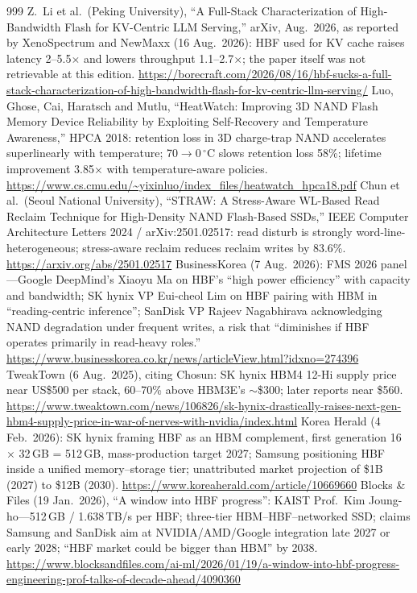 \begin{thebibliography}{999}
 Z.~Li et al.\ (Peking University), ``A Full-Stack Characterization of High-Bandwidth Flash for KV-Centric LLM Serving,'' arXiv, Aug.\ 2026, as reported by XenoSpectrum and NewMaxx (16 Aug.\ 2026): HBF used for KV cache raises latency 2--5.5$\times$ and lowers throughput 1.1--2.7$\times$; the paper itself was not retrievable at this edition. \url{https://borecraft.com/2026/08/16/hbf-sucks-a-full-stack-characterization-of-high-bandwidth-flash-for-kv-centric-llm-serving/}
 Luo, Ghose, Cai, Haratsch and Mutlu, ``HeatWatch: Improving 3D NAND Flash Memory Device Reliability by Exploiting Self-Recovery and Temperature Awareness,'' HPCA 2018: retention loss in 3D charge-trap NAND accelerates superlinearly with temperature; 70$\to$0\,$^\circ$C slows retention loss 58\%; lifetime improvement 3.85$\times$ with temperature-aware policies. \url{https://www.cs.cmu.edu/~yixinluo/index_files/heatwatch_hpca18.pdf}
 Chun et al.\ (Seoul National University), ``STRAW: A Stress-Aware WL-Based Read Reclaim Technique for High-Density NAND Flash-Based SSDs,'' IEEE Computer Architecture Letters 2024 / arXiv:2501.02517: read disturb is strongly word-line-heterogeneous; stress-aware reclaim reduces reclaim writes by 83.6\%. \url{https://arxiv.org/abs/2501.02517}
 BusinessKorea (7 Aug.\ 2026): FMS 2026 panel---Google DeepMind's Xiaoyu Ma on HBF's ``high power efficiency'' with capacity and bandwidth; SK hynix VP Eui-cheol Lim on HBF pairing with HBM in ``reading-centric inference''; SanDisk VP Rajeev Nagabhirava acknowledging NAND degradation under frequent writes, a risk that ``diminishes if HBF operates primarily in read-heavy roles.'' \url{https://www.businesskorea.co.kr/news/articleView.html?idxno=274396}
 TweakTown (6 Aug.\ 2025), citing Chosun: SK hynix HBM4 12-Hi supply price near US\$500 per stack, 60--70\% above HBM3E's $\sim$\$300; later reports near \$560. \url{https://www.tweaktown.com/news/106826/sk-hynix-drastically-raises-next-gen-hbm4-supply-price-in-war-of-nerves-with-nvidia/index.html}
 Korea Herald (4 Feb.\ 2026): SK hynix framing HBF as an HBM complement, first generation 16 $\times$ 32\,GB = 512\,GB, mass-production target 2027; Samsung positioning HBF inside a unified memory--storage tier; unattributed market projection of \$1B (2027) to \$12B (2030). \url{https://www.koreaherald.com/article/10669660}
 Blocks \& Files (19 Jan.\ 2026), ``A window into HBF progress'': KAIST Prof.\ Kim Joung-ho---512\,GB / 1.638\,TB/s per HBF; three-tier HBM--HBF--networked SSD; claims Samsung and SanDisk aim at NVIDIA/AMD/Google integration late 2027 or early 2028; ``HBF market could be bigger than HBM'' by 2038. \url{https://www.blocksandfiles.com/ai-ml/2026/01/19/a-window-into-hbf-progress-engineering-prof-talks-of-decade-ahead/4090360}

\end{thebibliography}
